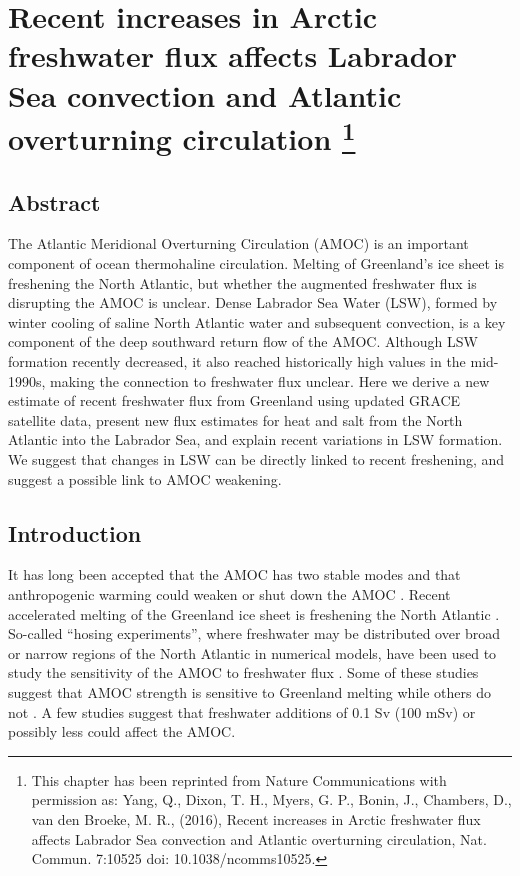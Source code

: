 \chapter[Recent increases in Arctic freshwater flux affects Labrador Sea convection and Atlantic overturning circulation]{Recent increases in Arctic freshwater flux affects Labrador Sea convection and Atlantic overturning circulation \footnote{This chapter has been reprinted from Nature Communications with permission as: Yang, Q., Dixon, T. H., Myers, G. P., Bonin, J., Chambers, D., van den Broeke, M. R., (2016), Recent increases in Arctic freshwater flux affects Labrador Sea convection and Atlantic overturning circulation, Nat. Commun. 7:10525 doi: 10.1038/ncomms10525.}}

\section{Abstract}
The Atlantic Meridional Overturning Circulation (AMOC) is an important component of ocean thermohaline circulation.  Melting of Greenland’s ice sheet is freshening the North Atlantic, but whether the augmented freshwater flux is disrupting the AMOC is unclear.  Dense Labrador Sea Water (LSW), formed by winter cooling of saline North Atlantic water and subsequent convection, is a key component of the deep southward return flow of the AMOC.  Although LSW formation recently decreased, it also reached historically high values in the mid-1990s, making the connection to freshwater flux unclear.   Here we derive a new estimate of recent freshwater flux from Greenland using updated GRACE satellite data, present new flux estimates for heat and salt from the North Atlantic into the Labrador Sea, and explain recent variations in LSW formation.  We suggest that changes in LSW can be directly linked to recent freshening, and suggest a possible link to AMOC weakening.

\section{Introduction}
It has long been accepted that the AMOC has two stable modes \cite[]{stommel1961,rooth1982,broecker1985} and that anthropogenic warming could weaken or shut down the AMOC \cite[]{broecker1987,wood1999}.  Recent accelerated melting of the Greenland ice sheet is freshening the North Atlantic \cite[]{jiang2010,rignot2011,enderlin2014,velicogna2014regional,yang2013}.  So-called “hosing experiments”, where freshwater may be distributed over broad or narrow regions of the North Atlantic in numerical models, have been used to study the sensitivity of the AMOC to freshwater flux \cite{fichefet2003,jungclaus2006,stouffer2006,hu2011,swingedow2013,ridley2005,brunnabend2015}.  Some of these studies suggest that AMOC strength is sensitive to Greenland melting \cite[]{fichefet2003,brunnabend2015} while others do not \cite[]{jungclaus2006,hu2011,ridley2005}.  A few studies suggest that freshwater additions of 0.1 Sv (100 mSv) \cite[]{rahmstorf1995,rahmstorf2005,hawkins2011} or possibly less \cite[]{fichefet2003,brunnabend2015}could affect the AMOC. 

